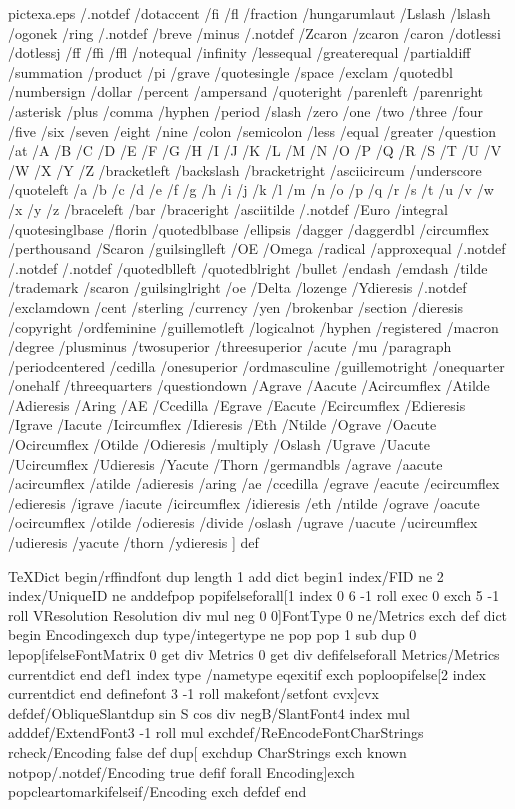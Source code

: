 \begin{filecontents*}{pictexa.eps}
 /.notdef /dotaccent /fi /fl
 /fraction /hungarumlaut /Lslash /lslash
 /ogonek /ring /.notdef /breve
 /minus /.notdef /Zcaron /zcaron
 /caron /dotlessi /dotlessj /ff
 /ffi /ffl /notequal /infinity
 /lessequal /greaterequal /partialdiff /summation
 /product /pi /grave /quotesingle
 /space /exclam /quotedbl /numbersign
 /dollar /percent /ampersand /quoteright
 /parenleft /parenright /asterisk /plus
 /comma /hyphen /period /slash
 /zero /one /two /three
 /four /five /six /seven
 /eight /nine /colon /semicolon
 /less /equal /greater /question
 /at /A /B /C
 /D /E /F /G
 /H /I /J /K
 /L /M /N /O
 /P /Q /R /S
 /T /U /V /W
 /X /Y /Z /bracketleft
 /backslash /bracketright /asciicircum /underscore
 /quoteleft /a /b /c
 /d /e /f /g
 /h /i /j /k
 /l /m /n /o
 /p /q /r /s
 /t /u /v /w
 /x /y /z /braceleft
 /bar /braceright /asciitilde /.notdef
 /Euro /integral /quotesinglbase /florin
 /quotedblbase /ellipsis /dagger /daggerdbl
 /circumflex /perthousand /Scaron /guilsinglleft
 /OE /Omega /radical /approxequal
 /.notdef /.notdef /.notdef /quotedblleft
 /quotedblright /bullet /endash /emdash
 /tilde /trademark /scaron /guilsinglright
 /oe /Delta /lozenge /Ydieresis
 /.notdef /exclamdown /cent /sterling
 /currency /yen /brokenbar /section
 /dieresis /copyright /ordfeminine /guillemotleft
 /logicalnot /hyphen /registered /macron
 /degree /plusminus /twosuperior /threesuperior
 /acute /mu /paragraph /periodcentered
 /cedilla /onesuperior /ordmasculine /guillemotright
 /onequarter /onehalf /threequarters /questiondown
 /Agrave /Aacute /Acircumflex /Atilde
 /Adieresis /Aring /AE /Ccedilla
 /Egrave /Eacute /Ecircumflex /Edieresis
 /Igrave /Iacute /Icircumflex /Idieresis
 /Eth /Ntilde /Ograve /Oacute
 /Ocircumflex /Otilde /Odieresis /multiply
 /Oslash /Ugrave /Uacute /Ucircumflex
 /Udieresis /Yacute /Thorn /germandbls
 /agrave /aacute /acircumflex /atilde
 /adieresis /aring /ae /ccedilla
 /egrave /eacute /ecircumflex /edieresis
 /igrave /iacute /icircumflex /idieresis
 /eth /ntilde /ograve /oacute
 /ocircumflex /otilde /odieresis /divide
 /oslash /ugrave /uacute /ucircumflex
 /udieresis /yacute /thorn /ydieresis
] def

TeXDict begin/rf{findfont dup length 1 add dict begin{1 index/FID ne 2
index/UniqueID ne and{def}{pop pop}ifelse}forall[1 index 0 6 -1 roll
exec 0 exch 5 -1 roll VResolution Resolution div mul neg 0 0]FontType 0
ne{/Metrics exch def dict begin Encoding{exch dup type/integertype ne{
pop pop 1 sub dup 0 le{pop}{[}ifelse}{FontMatrix 0 get div Metrics 0 get
div def}ifelse}forall Metrics/Metrics currentdict end def}{{1 index type
/nametype eq{exit}if exch pop}loop}ifelse[2 index currentdict end
definefont 3 -1 roll makefont/setfont cvx]cvx def}def/ObliqueSlant{dup
sin S cos div neg}B/SlantFont{4 index mul add}def/ExtendFont{3 -1 roll
mul exch}def/ReEncodeFont{CharStrings rcheck{/Encoding false def dup[
exch{dup CharStrings exch known not{pop/.notdef/Encoding true def}if}
forall Encoding{]exch pop}{cleartomark}ifelse}if/Encoding exch def}def
end


\end{filecontents*}
